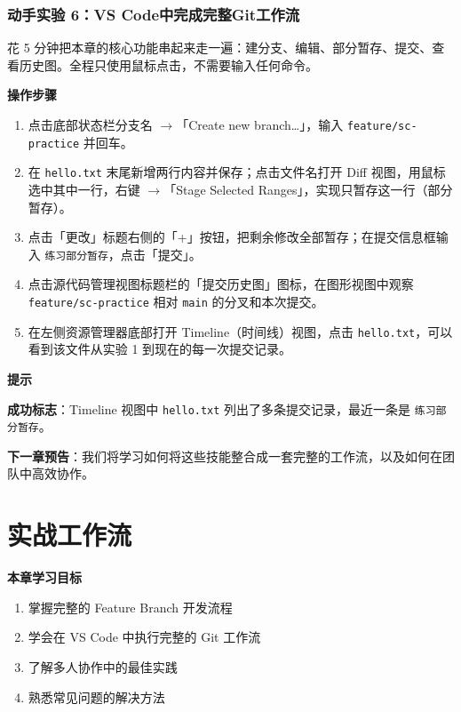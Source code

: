 \documentclass[12pt,a4paper,openany]{ctexbook}
\newenvironment{tipbox}{%
  \medskip
  \noindent\textbf{\faLightbulb\; 提示}
  \smallskip
}{%
  \medskip
}
\newenvironment{stepbox}{%
  \medskip
  \noindent\textbf{\faCogs\; 操作步骤}
  \smallskip
}{%
  \medskip
}
\begin{document}
\subsection*{动手实验 6：VS Code中完成完整Git工作流}

花 5 分钟把本章的核心功能串起来走一遍：建分支、编辑、部分暂存、提交、查看历史图。全程只使用鼠标点击，不需要输入任何命令。

\begin{stepbox}
\begin{enumerate}[leftmargin=1.5em]
  \item 点击底部状态栏分支名 $\to$「Create new branch…」，输入 \texttt{feature/sc-practice} 并回车。
  \item 在 \texttt{hello.txt} 末尾新增两行内容并保存；点击文件名打开 Diff 视图，用鼠标选中其中一行，右键 $\to$「Stage Selected Ranges」，实现只暂存这一行（部分暂存）。
  \item 点击「更改」标题右侧的「+」按钮，把剩余修改全部暂存；在提交信息框输入 \texttt{练习部分暂存}，点击「提交」。
  \item 点击源代码管理视图标题栏的「提交历史图」图标，在图形视图中观察 \texttt{feature/sc-practice} 相对 \texttt{main} 的分叉和本次提交。
  \item 在左侧资源管理器底部打开 Timeline（时间线）视图，点击 \texttt{hello.txt}，可以看到该文件从实验 1 到现在的每一次提交记录。
\end{enumerate}
\end{stepbox}

\begin{tipbox}
\textbf{成功标志}：Timeline 视图中 \texttt{hello.txt} 列出了多条提交记录，最近一条是 \texttt{练习部分暂存}。

\textbf{下一章预告}：我们将学习如何将这些技能整合成一套完整的工作流，以及如何在团队中高效协作。
\end{tipbox}

\chapter{实战工作流}

\begin{infobox}
\textbf{本章学习目标}
\begin{enumerate}[leftmargin=1.5em]
  \item 掌握完整的 Feature Branch 开发流程
  \item 学会在 VS Code 中执行完整的 Git 工作流
  \item 了解多人协作中的最佳实践
  \item 熟悉常见问题的解决方法
\end{enumerate}
\end{infobox}
\end{document}
